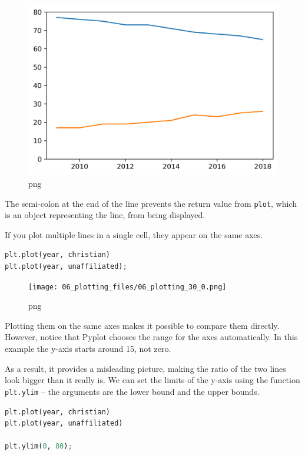 \documentclass[
]{book}
\newcommand{\passthrough}[1]{#1}
\begin{document}
\begin{figure}
\centering
\includegraphics{06_plotting_files/06_plotting_28_0.png}
\caption{png}
\end{figure}

The semi-colon at the end of the line prevents the return value from
\passthrough{\lstinline!plot!}, which is an object representing the
line, from being displayed.

If you plot multiple lines in a single cell, they appear on the same
axes.

\begin{lstlisting}[language=Python]
plt.plot(year, christian)
plt.plot(year, unaffiliated);
\end{lstlisting}

\begin{figure}
\centering
\texttt{[image: 06\_plotting\_files/06\_plotting\_30\_0.png]}
\caption{png}
\end{figure}

Plotting them on the same axes makes it possible to compare them
directly. However, notice that Pyplot chooses the range for the axes
automatically. In this example the y-axis starts around 15, not zero.

As a result, it provides a misleading picture, making the ratio of the
two lines look bigger than it really is. We can set the limits of the
y-axis using the function \passthrough{\lstinline!plt.ylim!} -- the
arguments are the lower bound and the upper bounds.

\begin{lstlisting}[language=Python]
plt.plot(year, christian)
plt.plot(year, unaffiliated)

plt.ylim(0, 80);
\end{lstlisting}
\end{document}
